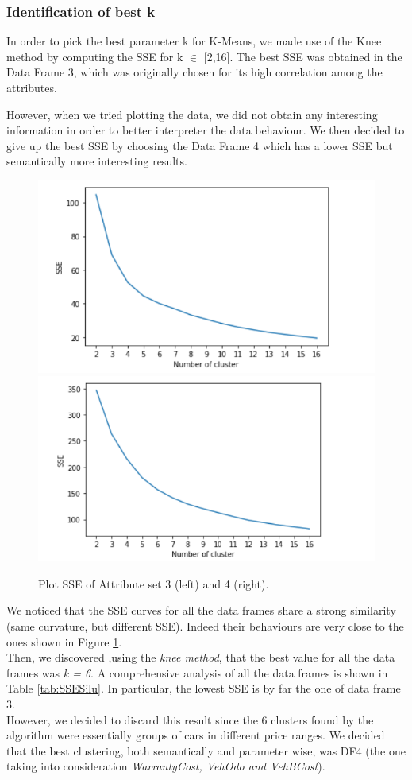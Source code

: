 \documentclass{article}
\begin{document}
	
	\subsubsection{Identification of best k}
	
	
	In order to pick the best parameter k for K-Means, we made use of the Knee method by computing the SSE for k $\in$ [2,16]. The best SSE was obtained in the Data Frame 3, which was originally chosen for its high correlation among the attributes.
	
	However, when we tried plotting the data, we did not obtain any interesting information in order to better interpreter the data behaviour. We then decided to give up the best SSE by choosing the Data Frame 4 which has a lower SSE but semantically more interesting results.
	
	
	\begin{figure}[H]
		\centering
		\includegraphics[width=.49\textwidth]{cattura}\hfill
		\includegraphics[width=.49\textwidth]{SSE2}
		\caption{Plot SSE of Attribute set 3 (left) and 4 (right).}
		\label{fig:KmeansSSE}
	\end{figure}
	We noticed that the SSE curves for all the data frames share a strong similarity (same curvature, but different SSE). Indeed their behaviours are very close to the ones shown in Figure \ref{fig:KmeansSSE}.\\
	Then, we discovered ,using the \emph{knee method}, that the best value for all the data frames was \emph{k = 6}. A comprehensive analysis of all the data frames is shown in Table \ref{tab:SSESilu}. In particular, the lowest SSE is by far the one of data frame 3.\\
	However, we decided to discard this result since the 6 clusters found by the algorithm were essentially groups of cars in different price ranges. We decided that the best clustering, both semantically and parameter wise, was DF4 (the one taking into consideration \emph{WarrantyCost, VehOdo and VehBCost}).
	
\end{document}
